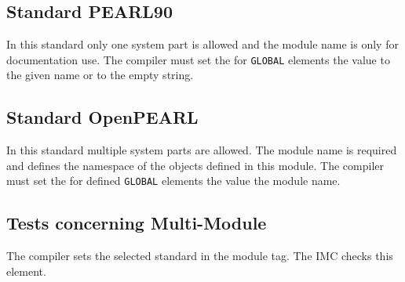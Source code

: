 \subsection{Standard PEARL90}
In this standard only one system part is allowed and the module name is only
for documentation use.
The compiler must set the for \verb|GLOBAL| elements the value to the given name or to the empty string.

\subsection{Standard OpenPEARL}
In this standard multiple system parts are allowed.
The module name is required and defines the namespace of the objects defined in this module.
The compiler must set the for defined \verb|GLOBAL| elements the value the module name.

\subsection{Tests concerning Multi-Module}
The compiler sets the selected standard in the module tag. 
The IMC checks this element.
